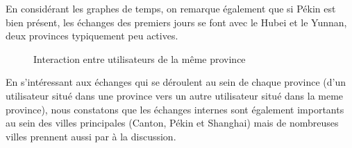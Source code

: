 En consid\'erant les graphes de temps, on remarque \'egalement que si
P\'ekin est bien pr\'esent, les \'echanges des premiers jours se font
avec le Hubei et le Yunnan, deux provinces typiquement peu actives. 

\begin{figure}
    \centering

     

    \caption{
        Interaction entre utilisateurs de la m\^eme province
    }

\end{figure}

En s{\textquoteright}int\'eressant aux \'echanges qui se d\'eroulent au
sein de chaque province (d{\textquoteright}un utilisateur situ\'e dans
une province vers un autre utilisateur situ\'e dans la meme province),
nous constatons que les \'echanges internes sont \'egalement importants
au sein des villes principales (Canton, P\'ekin et Shanghai) mais de
nombreuses villes prennent aussi par \`a la discussion. 


